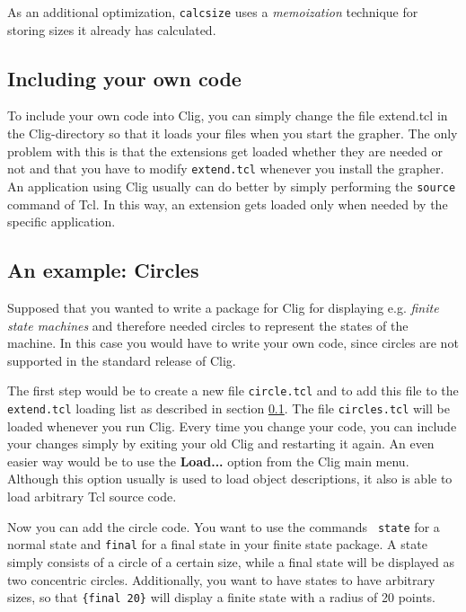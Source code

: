 As an additional optimization, {\tt calcsize} uses a {\it
memoization\/} technique for storing sizes it already has calculated.


\subsection{Including your own code}
\label{include}

To include your own code into {\sc Clig}, you can simply change the
file {extend.tcl} in the {\sc Clig}-directory so that it loads your
files when you start the grapher. The only problem with this is that
the extensions get loaded whether they are needed or not and that you
have to modify {\tt extend.tcl} whenever you install the grapher. An
application using {\sc Clig} usually can do better by simply
performing the {\tt source} command of {\sc Tcl}. In this way, an
extension gets loaded only when needed by the specific application. 


\subsection{An example: Circles}

Supposed that you wanted to write a package for {\sc Clig} for
displaying e.g. {\em finite state machines\/} and therefore needed
circles to represent the states of the machine. In this case you would
have to write your own code, since circles are not supported in the
standard release of {\sc Clig}.

The first step would be to create a new file {\tt circle.tcl} and to
add this file to the {\tt extend.tcl} loading list as described in
section \ref{include}. The file {\tt circles.tcl} will be loaded
whenever you run {\sc Clig}. Every time you change your code, you can
include your changes simply by exiting your old {\sc Clig} and restarting
it again. An even easier way would be to use the {\bf Load...}  option
from the {\sc Clig} main menu. Although this option usually is used to
load object descriptions, it also is able to load arbitrary {\sc Tcl}
source code.

Now you can add the circle code. You want to use the commands {\tt
state} for a normal state and {\tt final} for a final state in your
finite state package. A state simply consists of a circle of a
certain size, while a final state will be displayed as two concentric
circles. Additionally, you want to have states to have arbitrary sizes,
so that \verb'{final 20}' will display a finite state with a radius of 
20 points.


